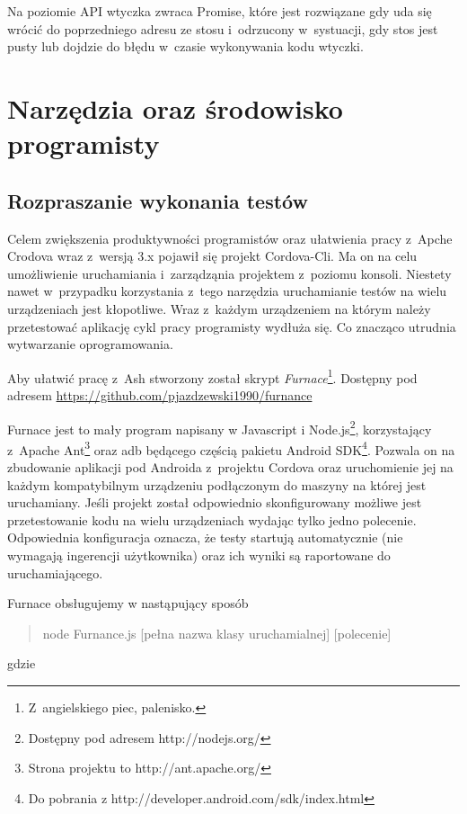 \documentclass[brudnopis]{xmgr}
\begin{document}
Na poziomie API wtyczka zwraca Promise, które jest rozwiązane gdy uda się wrócić do poprzedniego adresu ze stosu i~odrzucony w~systuacji, gdy stos jest pusty lub dojdzie do błędu w~czasie wykonywania kodu wtyczki.

\chapter{Narzędzia oraz środowisko programisty}

\section{Rozpraszanie wykonania testów}

Celem zwiększenia produktywności programistów oraz ułatwienia pracy z~Apche Crodova wraz z~wersją 3.x pojawił się projekt Cordova-Cli. Ma on na celu umożliwienie uruchamiania i~zarządząnia projektem z~poziomu konsoli. Niestety nawet w~przypadku korzystania z~tego narzędzia uruchamianie testów na wielu urządzeniach jest kłopotliwe. Wraz z~każdym urządzeniem na którym należy przetestować aplikację cykl pracy programisty wydłuża się. Co znacząco utrudnia wytwarzanie oprogramowania.

Aby ułatwić pracę z~Ash stworzony został skrypt \textit{Furnace}\footnote{Z~angielskiego piec, palenisko.}. Dostępny pod adresem \url{https://github.com/pjazdzewski1990/furnance}

Furnace jest to mały program napisany w Javascript i Node.js\footnote{Dostępny pod adresem http://nodejs.org/}, korzystający z~Apache Ant\footnote{Strona projektu to  http://ant.apache.org/} oraz adb będącego częścią pakietu Android SDK\footnote{Do pobrania z http://developer.android.com/sdk/index.html}. Pozwala on na zbudowanie aplikacji pod Androida z~projektu Cordova oraz uruchomienie jej na każdym kompatybilnym urządzeniu podłączonym do maszyny na której jest uruchamiany. Jeśli projekt został odpowiednio skonfigurowany możliwe jest przetestowanie kodu na wielu urządzeniach wydając tylko jedno polecenie. Odpowiednia konfiguracja oznacza, że testy startują automatycznie (nie wymagają ingerencji użytkownika) oraz ich wyniki są raportowane do uruchamiającego. 

Furnace obsługujemy w nastąpujący sposób

\begin{quote}
	node Furnance.js [pełna nazwa klasy uruchamialnej] [polecenie]
\end{quote}

gdzie
\end{document}
